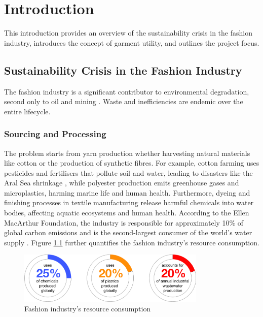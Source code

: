 \chapter{Introduction}

This introduction provides an overview of the sustainability crisis in the fashion industry, introduces the concept of garment utility, and outlines the project focus.

\section{Sustainability Crisis in the Fashion Industry}
The fashion industry is a significant contributor to environmental degradation, second only to oil and mining \cite{charter_accelerating_2024}. Waste and inefficiencies are endemic over the entire lifecycle. 
\subsection{Sourcing and Processing}
The problem starts from yarn production whether harvesting natural materials like cotton or the production of synthetic fibres. For example, cotton farming uses pesticides and fertilisers that pollute soil and water, leading to disasters like the Aral Sea shrinkage \cite{noauthor_aral_nodate}, while polyester production emits greenhouse gases and microplastics, harming marine life and human health. Furthermore, dyeing and finishing processes in textile manufacturing release harmful chemicals into water bodies, affecting aquatic ecosystems and human health. According to the Ellen MacArthur Foundation, the industry is responsible for approximately 10\% of global carbon emissions and is the second-largest consumer of the world's water supply \cite{ellen_macarthur_foundation_new_2017}. Figure \ref{fig:resource_consumption} further quantifies the fashion industry's resource consumption.
\begin{figure} [H]
    \centering
    \includegraphics[width=0.8\textwidth]{Images/sourcing donuts.png}
    \caption{Fashion industry's resource consumption \cite{charter_accelerating_2024}}
    \label{fig:resource_consumption}
\end{figure}
